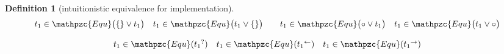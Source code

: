 \documentclass[12pt]{article}
\newtheorem{Definition}{Definition}[section]
\begin{document}
\begin{Definition}[intuitionistic equivalence for implementation]
\begin{displaymath}
\begin{array}{c}
      \begin{array}{ll}
        \begin{array}{ll}
          t_1 \in \mathpzc{Equ}\bigl(\{\} \vee t_1 \bigr)
          & t_1 \in \mathpzc{Equ}\bigl(t_1 \vee \{\} \bigr)
        \end{array}
        & \begin{array}{ll}
            t_1 \in \mathpzc{Equ}\bigl(\circ \vee t_1 \bigr)
            & t_1 \in \mathpzc{Equ}\bigl(t_1 \vee \circ \bigr)
          \end{array}
      \end{array}  \\
      \\
      
      \begin{array}{lll}
        t_1 \in \mathpzc{Equ}({t_1}^?)
        & t_1 \in \mathpzc{Equ}({t_1}^{\leftarrow})
        & t_1 \in \mathpzc{Equ}({t_1}^{\rightarrow})
      \end{array}
      
    \end{array}
  \end{displaymath}
\end{Definition}
\end{document}
